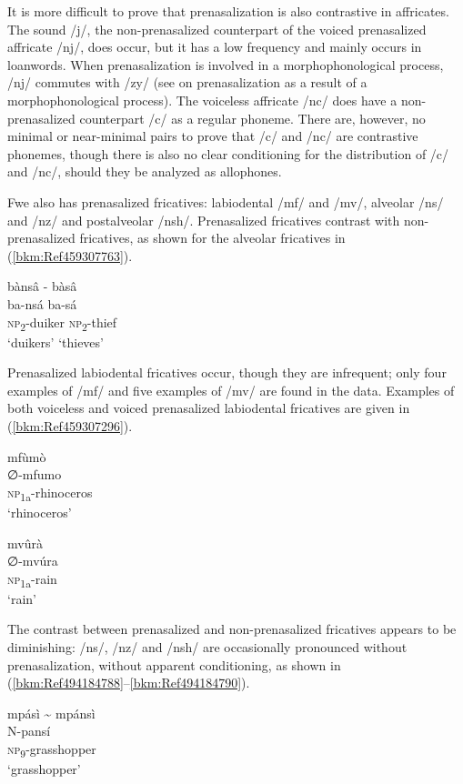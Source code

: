 It is more difficult to prove that prenasalization is also contrastive in affricates. The sound /j/, the non-prenasalized counterpart of the voiced prenasalized affricate /nj/, does occur, but it has a low frequency and mainly occurs in loanwords. When prenasali\-zation is involved in a morphophonological process, /nj/ commutes with /zy/ (see  on prenasalization as a result of a morphophonological process). The voiceless affricate /nc/ does have a non-prenasalized counterpart /c/ as a regular phoneme. There are, however, no minimal or near-mini\-mal pairs to prove that /c/ and /nc/ are contrastive phonemes, though there is also no clear condi\-tioning for the distribution of /c/ and /nc/, should they be analyzed as allophones.

Fwe also has prenasalized fricatives: labiodental /mf/ and /mv/, alveolar /ns/ and /nz/ and postalveolar /nsh/. Prenasalized fricatives contrast with non-pre\-na\-sal\-ized fricatives, as shown for the alveolar fricatives in (\ref{bkm:Ref459307763}).

\ea
\label{bkm:Ref459307763}
bànsâ  \tab    - \tab  bàsâ\\
ba-nsá    \tab\tab    ba-sá\\
\textsc{np}\textsubscript{2}-duiker  \tab\tab  \textsc{np}\textsubscript{2}-thief\\
\glt ‘duikers’  \tab\tab  ‘thieves’
\z

Prenasalized labiodental fricatives occur, though they are infrequent; only four exam\-ples of /mf/ and five examples of /mv/ are found in the data. Examples of both voiceless and voiced prenasal\-ized labiodental fricatives are given in (\ref{bkm:Ref459307296}).

\ea
\label{bkm:Ref459307296}
\glll mfùmò\\
∅-mfumo\\
\textsc{np}\textsubscript{1a}-rhinoceros\\
\glt ‘rhinoceros’
\z

\ea
\glll mvûrà\\
∅-mvúra\\
\textsc{np}\textsubscript{1a}-rain\\
\glt ‘rain’
\z

The contrast between prenasalized and non-prenasalized fricatives appears to be diminishing: /ns/, /nz/ and /nsh/ are occasionally pronounced without prenasalization, without apparent conditioning, as shown in (\ref{bkm:Ref494184788}--\ref{bkm:Ref494184790}).

\ea
\label{bkm:Ref494184788}
mpásì {\textasciitilde} mpánsì\\
N-pansí\\
\textsc{np}\textsubscript{9}-grasshopper\\
\glt ‘grasshopper’
\z


